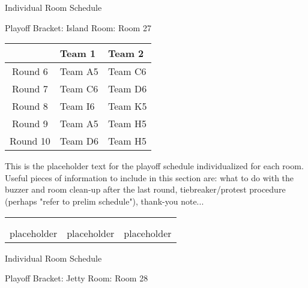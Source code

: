 \documentclass{article}%
\begin{document}
\newpage%
\begin{center}%
\begin{Huge}%
Individual Room Schedule%
\end{Huge}%
\vspace*{16pt}%
\linebreak%
\begin{Large}%
Playoff Bracket: Island \hfill Room: Room 27%
\end{Large}%
\end{center}%
%
\begin{tabularx}{\textwidth}{|c|Y|Y|}%
\hline%
&Team 1&Team 2\\%
\hline%
Round 6&Team A5&Team C6\\%
Round 7&Team C6&Team D6\\%
Round 8&Team I6&Team K5\\%
Round 9&Team A5&Team H5\\%
Round 10&Team D6&Team H5\\%
\hline%
\end{tabularx}%
\vspace*{16pt}%
\linebreak%
This is the placeholder text for the playoff schedule individualized for each room. Useful pieces of information to include in this section are: what to do with the buzzer and room clean{-}up after the last round, tiebreaker/protest procedure (perhaps "refer to prelim schedule"), thank{-}you note...%
\vspace*{30pt}%
\newline%
%
\begin{tabularx}{\textwidth}{YYY}%
  &  &  \\%
\\%
placeholder&placeholder&placeholder\\%
\end{tabularx}%
\newpage%
\begin{center}%
\begin{Huge}%
Individual Room Schedule%
\end{Huge}%
\vspace*{16pt}%
\linebreak%
\begin{Large}%
Playoff Bracket: Jetty \hfill Room: Room 28%
\end{Large}%
\end{center}%
\end{document}
